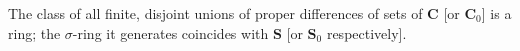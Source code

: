 The class of all finite, disjoint unions of proper differences of sets of $\mathbf{C}$ [or $\mathbf{C}_0$] is a ring; the $\sigma$-ring it generates coincides with $\mathbf{S}$ [or $\mathbf{S}_0$ respectively].
